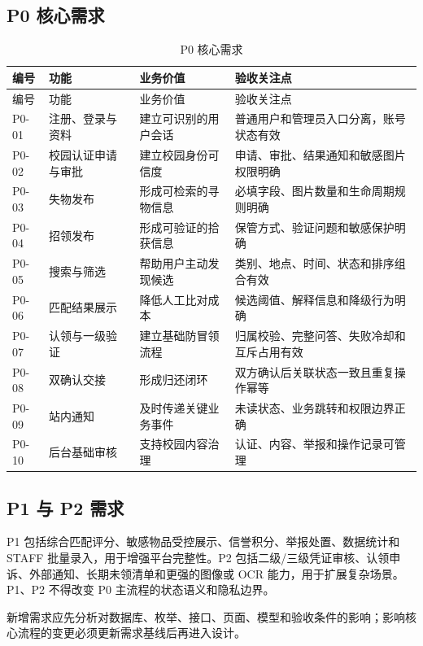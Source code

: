 \subsection{P0 核心需求}

\small
\begin{longtable}{L{1.5cm} L{4.0cm} L{4.4cm} L{4.0cm}}
  \caption{P0 核心需求}\label{tab:p0}\\
  \toprule
  编号 & 功能 & 业务价值 & 验收关注点 \\
  \midrule
  \endfirsthead
  \toprule
  编号 & 功能 & 业务价值 & 验收关注点 \\
  \midrule
  \endhead
  P0-01 & 注册、登录与资料 & 建立可识别的用户会话 & 普通用户和管理员入口分离，账号状态有效 \\
  P0-02 & 校园认证申请与审批 & 建立校园身份可信度 & 申请、审批、结果通知和敏感图片权限明确 \\
  P0-03 & 失物发布 & 形成可检索的寻物信息 & 必填字段、图片数量和生命周期规则明确 \\
  P0-04 & 招领发布 & 形成可验证的拾获信息 & 保管方式、验证问题和敏感保护明确 \\
  P0-05 & 搜索与筛选 & 帮助用户主动发现候选 & 类别、地点、时间、状态和排序组合有效 \\
  P0-06 & 匹配结果展示 & 降低人工比对成本 & 候选阈值、解释信息和降级行为明确 \\
  P0-07 & 认领与一级验证 & 建立基础防冒领流程 & 归属校验、完整问答、失败冷却和互斥占用有效 \\
  P0-08 & 双确认交接 & 形成归还闭环 & 双方确认后关联状态一致且重复操作幂等 \\
  P0-09 & 站内通知 & 及时传递关键业务事件 & 未读状态、业务跳转和权限边界正确 \\
  P0-10 & 后台基础审核 & 支持校园内容治理 & 认证、内容、举报和操作记录可管理 \\
  \bottomrule
\end{longtable}
\normalsize

\subsection{P1 与 P2 需求}

P1 包括综合匹配评分、敏感物品受控展示、信誉积分、举报处置、数据统计和 STAFF 批量录入，用于增强平台完整性。P2 包括二级/三级凭证审核、认领申诉、外部通知、长期未领清单和更强的图像或 OCR 能力，用于扩展复杂场景。P1、P2 不得改变 P0 主流程的状态语义和隐私边界。

新增需求应先分析对数据库、枚举、接口、页面、模型和验收条件的影响；影响核心流程的变更必须更新需求基线后再进入设计。

